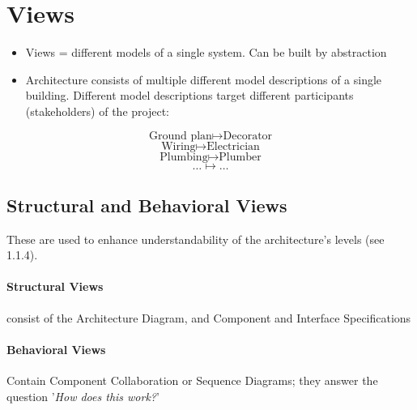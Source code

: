 		
	\section{Views}
		\begin{itemize}
			\item Views = different models of a single system. Can be built by abstraction
			\item Architecture consists of multiple different model descriptions of a single building. Different model descriptions target different participants (stakeholders) of the project:
		\end{itemize}
		$$ \text{Ground plan} \mapsto \text{Decorator} $$
		$$ \text{Wiring} \mapsto \text{Electrician} $$
		$$ \text{Plumbing} \mapsto \text{Plumber} $$
		$$ \ldots \mapsto \ldots $$
		
		\subsection{Structural and Behavioral Views}
			These are used to enhance understandability of the architecture's levels (see 1.1.4).
			\paragraph*{Structural Views}  consist of the Architecture Diagram, and Component and Interface Specifications

			\paragraph*{Behavioral Views} Contain Component Collaboration or Sequence Diagrams; they answer the question '\textit{How does this work?}'\pagebreak
			
